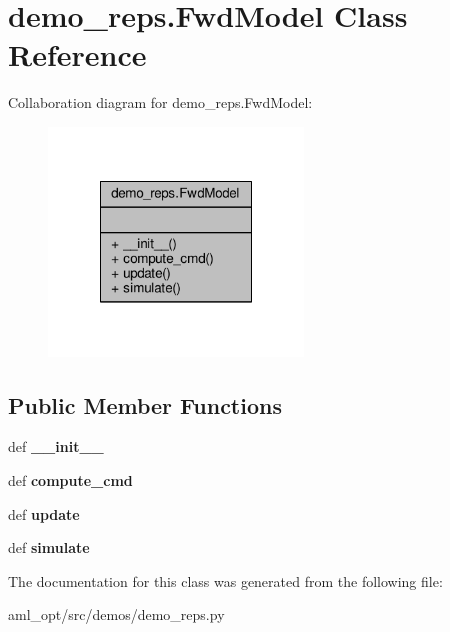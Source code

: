 \hypertarget{classdemo__reps_1_1_fwd_model}{\section{demo\-\_\-reps.\-Fwd\-Model Class Reference}
\label{classdemo__reps_1_1_fwd_model}
}


Collaboration diagram for demo\-\_\-reps.\-Fwd\-Model\-:
\nopagebreak
\begin{figure}[H]
\begin{center}
\leavevmode
\includegraphics[width=192pt]{classdemo__reps_1_1_fwd_model__coll__graph}
\end{center}
\end{figure}
\subsection*{Public Member Functions}
\begin{DoxyCompactItemize}
\item 
\hypertarget{classdemo__reps_1_1_fwd_model_a999d500eb1447029a8880c40fe2fb65a}{def {\bfseries \-\_\-\-\_\-init\-\_\-\-\_\-}}\label{classdemo__reps_1_1_fwd_model_a999d500eb1447029a8880c40fe2fb65a}

\item 
\hypertarget{classdemo__reps_1_1_fwd_model_ae448aafaa24b011746e29b7fe4343e31}{def {\bfseries compute\-\_\-cmd}}\label{classdemo__reps_1_1_fwd_model_ae448aafaa24b011746e29b7fe4343e31}

\item 
\hypertarget{classdemo__reps_1_1_fwd_model_aeda56a2c496e7aefa361b62b49504ae9}{def {\bfseries update}}\label{classdemo__reps_1_1_fwd_model_aeda56a2c496e7aefa361b62b49504ae9}

\item 
\hypertarget{classdemo__reps_1_1_fwd_model_a58c2978f60c6bc448acae52820275a20}{def {\bfseries simulate}}\label{classdemo__reps_1_1_fwd_model_a58c2978f60c6bc448acae52820275a20}

\end{DoxyCompactItemize}


The documentation for this class was generated from the following file\-:\begin{DoxyCompactItemize}
\item 
aml\-\_\-opt/src/demos/demo\-\_\-reps.\-py\end{DoxyCompactItemize}
